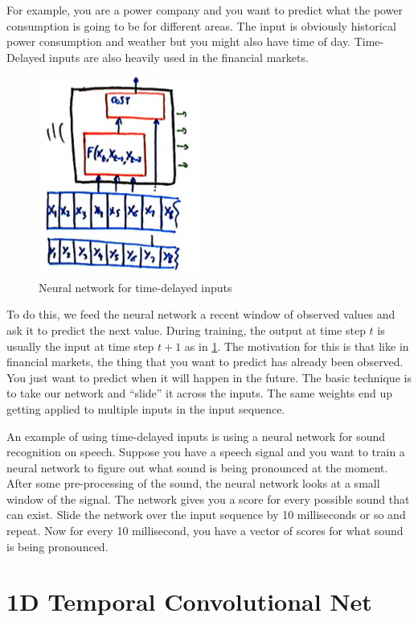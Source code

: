 For example, you are a power company and you want to predict what the power consumption is going to be for different areas. 
The input is obviously historical power consumption and weather but you might also have time of day. 
Time-Delayed inputs are also heavily used in the financial markets. 

\begin{figure}
    \centering
    \includegraphics[width=150pt]{figs/td_inputs.png}
    \caption{Neural network for time-delayed inputs}
    \label{fig:td_inputs}
\end{figure}

To do this, we feed the neural network a recent window of observed values and ask it to predict the next value. 
During training, the output at time step $t$ is usually the input at time step $t+1$ as in \cref{fig:td_inputs}. 
The motivation for this is that like in financial markets, the thing that you want to predict has already been observed. 
You just want to predict when it will happen in the future. 
The basic technique is to take our network and ``slide'' it across the inputs. 
The same weights end up getting applied to multiple inputs in the input sequence. 

An example of using time-delayed inputs is using a neural network for sound recognition on speech. 
Suppose you have a speech signal and you want to train a neural network to figure out what sound is being pronounced at the moment. 
After some pre-processing of the sound, the neural network looks at a small window of the signal. 
The network gives you a score for every possible sound that can exist. 
Slide the network over the input sequence by 10 milliseconds or so and repeat. 
Now for every 10 millisecond, you have a vector of scores for what sound is being pronounced.

\section{1D Temporal Convolutional Net}

